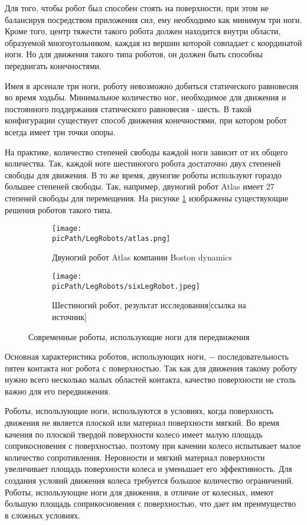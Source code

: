 \documentclass[oneside,final,14pt]{extreport}
\newcommand{\picPath}{img}
\begin{document}
Для того, чтобы робот был способен стоять на поверхности, при этом не балансируя посредством приложения сил, ему необходимо как минимум три ноги. Кроме того, центр тяжести такого робота должен находится внутри области, образуемой многоугольником, каждая из вершин которой совпадает с координатой ноги. Но для движения такого типа роботов, он должен быть способны передвигать конечностями. 

Имея в арсенале три ноги, роботу невозможно добиться статического равновесия во время ходьбы. Минимальное количество ног, необходимое для движения и постоянного поддержания статического равновесия - шесть. В такой конфигурации существует способ движения конечностями, при котором робот всегда имеет три точки опоры. 

На практике, количество степеней свободы каждой ноги зависит от их общего количества. Так, каждой ноге шестиногого робота достаточно двух степеней свободы для движения. В то же время, двуногие роботы используют гораздо большее степеней свободы. Так, например, двуногий робот Atlas имеет 27 степеней свободы для перемещения. На рисунке \ref{Figure:LegRobots} изображены существующие решения роботов такого типа.


\begin{figure}[H]
  \centering
  \begin{subfigure}[b]{0.4\linewidth}
   \texttt{[image: \\picPath/LegRobots/atlas.png]}
    \caption{ Двуногий робот Atlas компании Boston dynamics}
  \end{subfigure}
  \begin{subfigure}[b]{0.4\linewidth}
    \texttt{[image: \\picPath/LegRobots/sixLegRobot.jpeg]}
    \caption{ Шестиногий робот, результат исследования[ссылка на источник]}
  \end{subfigure}
  \caption{ Современные роботы, использующие ноги для передвижения}
  \label{Figure:LegRobots}
\end{figure}
Основная характеристика роботов, использующих ноги, $-$ последовательность пятен контакта ног робота с поверхностью. Так как для движения такому роботу нужно всего несколько малых областей контакта, качество поверхности не столь важно для его передвижения.

Роботы, использующие ноги, используются в условиях, когда поверхность движения не является плоской или материал поверхности мягкий. Во время качения по плоской твердой поверхности колесо имеет малую площадь соприкосновения с поверхностью, поэтому при качении колесо испытывает малое количество сопротивления. Неровности и мягкий материал поверхности увеличивает площадь поверхности колеса и уменьшает его эффективность. Для создания условий движения колеса требуется большое количество ограничений. Роботы, использующие ноги для движения, в отличие от колесных, имеют большую площадь соприкосновения с поверхностью, что дает им преимущество в сложных условиях.
\end{document}
